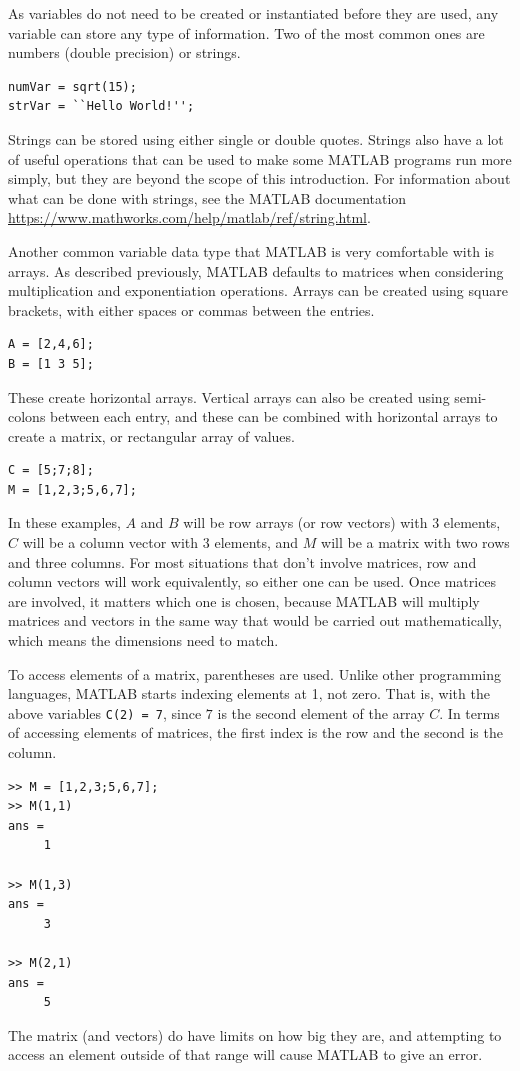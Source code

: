 \documentclass{ximera}
\begin{document}
As variables do not need to be created or instantiated before they are used, any variable can store any type of information. Two of the most common ones are numbers (double precision) or strings.

\begin{verbatim}
numVar = sqrt(15);
strVar = ``Hello World!'';
\end{verbatim}

Strings can be stored using either single or double quotes. Strings also have a lot of useful operations that can be used to make some MATLAB programs run more simply, but they are beyond the scope of this introduction. For information about what can be done with strings, see the MATLAB documentation \url{https://www.mathworks.com/help/matlab/ref/string.html}.

Another common variable data type that MATLAB is very comfortable with is arrays. As described previously, MATLAB defaults to matrices when considering multiplication and exponentiation operations. Arrays can be created using square brackets, with either spaces or commas between the entries.
\begin{verbatim}
A = [2,4,6];
B = [1 3 5];
\end{verbatim}
These create horizontal arrays. Vertical arrays can also be created using semi-colons between each entry, and these can be combined with horizontal arrays to create a matrix, or rectangular array of values.

\begin{verbatim}
C = [5;7;8];
M = [1,2,3;5,6,7];
\end{verbatim}
In these examples, $A$ and $B$ will be row arrays (or row vectors) with 3 elements, $C$ will be a column vector with $3$ elements, and $M$ will be a matrix with two rows and three columns. For most situations that don't involve matrices, row and column vectors will work equivalently, so either one can be used. Once matrices are involved, it matters which one is chosen, because MATLAB will multiply matrices and vectors in the same way that would be carried out mathematically, which means the dimensions need to match.

To access elements of a matrix, parentheses are used. Unlike other programming languages, MATLAB starts indexing elements at 1, not zero. That is, with the above variables \texttt{C(2) = 7}, since $7$ is the second element of the array $C$. In terms of accessing elements of matrices, the first index is the row and the second is the column.
\begin{verbatim}
>> M = [1,2,3;5,6,7];
>> M(1,1)
ans =
     1

>> M(1,3)
ans =
     3

>> M(2,1)
ans =
     5
\end{verbatim}
The matrix (and vectors) do have limits on how big they are, and attempting to access an element outside of that range will cause MATLAB to give an error.
\end{document}
